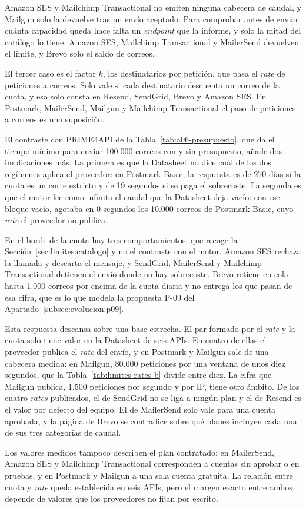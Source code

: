 Amazon SES y Mailchimp Transactional no emiten ninguna cabecera de caudal, y Mailgun solo la devuelve tras un envío aceptado.
Para comprobar antes de enviar cuánta capacidad queda hace falta un \textit{endpoint} que la informe, y solo la mitad del catálogo lo tiene.
Amazon SES, Mailchimp Transactional y MailerSend devuelven el límite, y Brevo solo el saldo de correos.

El tercer caso es el factor $k$, los destinatarios por petición, que pasa el \textit{rate} de peticiones a correos.
Solo vale si cada destinatario descuenta un correo de la cuota, y eso solo consta en Resend, SendGrid, Brevo y Amazon SES.
En Postmark, MailerSend, Mailgun y Mailchimp Transactional el paso de peticiones a correos es una suposición.

El contraste con PRIME4API de la Tabla~\ref{tab:a06-presupuesto}, que da el tiempo mínimo para enviar 100.000 correos con y sin presupuesto, añade dos implicaciones más.
La primera es que la Datasheet no dice cuál de los dos regímenes aplica el proveedor: en Postmark Basic, la respuesta es de 270 días si la cuota es un corte estricto y de 19 segundos si se paga el sobrecoste.
La segunda es que el motor lee como infinito el caudal que la Datasheet deja vacío: con ese bloque vacío, agotaba en 0 segundos los 10.000 correos de Postmark Basic, cuyo \textit{rate} el proveedor no publica.

En el borde de la cuota hay tres comportamientos, que recoge la Sección~\ref{sec:limites:catalogo} y no el contraste con el motor.
Amazon SES rechaza la llamada y descarta el mensaje, y SendGrid, MailerSend y Mailchimp Transactional detienen el envío donde no hay sobrecoste.
Brevo retiene en cola hasta 1.000 correos por encima de la cuota diaria y no entrega los que pasan de esa cifra, que es lo que modela la propuesta P-09 del Apartado~\ref{subsec:evolucion:p09}.

Esta respuesta descansa sobre una base estrecha.
El par formado por el \textit{rate} y la cuota solo tiene valor en la Datasheet de seis APIs.
En cuatro de ellas el proveedor publica el \textit{rate} del envío, y en Postmark y Mailgun sale de una cabecera medida: en Mailgun, 80.000 peticiones por una ventana de unos diez segundos, que la Tabla~\ref{tab:limites-rates-b} divide entre diez.
La cifra que Mailgun publica, 1.500 peticiones por segundo y por IP, tiene otro ámbito.
De los cuatro \textit{rates} publicados, el de SendGrid no se liga a ningún plan y el de Resend es el valor por defecto del equipo.
El de MailerSend solo vale para una cuenta aprobada, y la página de Brevo se contradice sobre qué planes incluyen cada una de sus tres categorías de caudal.

Los valores medidos tampoco describen el plan contratado: en MailerSend, Amazon SES y Mailchimp Transactional corresponden a cuentas sin aprobar o en pruebas, y en Postmark y Mailgun a una sola cuenta gratuita.
La relación entre cuota y \textit{rate} queda establecida en seis APIs, pero el margen exacto entre ambos depende de valores que los proveedores no fijan por escrito.
